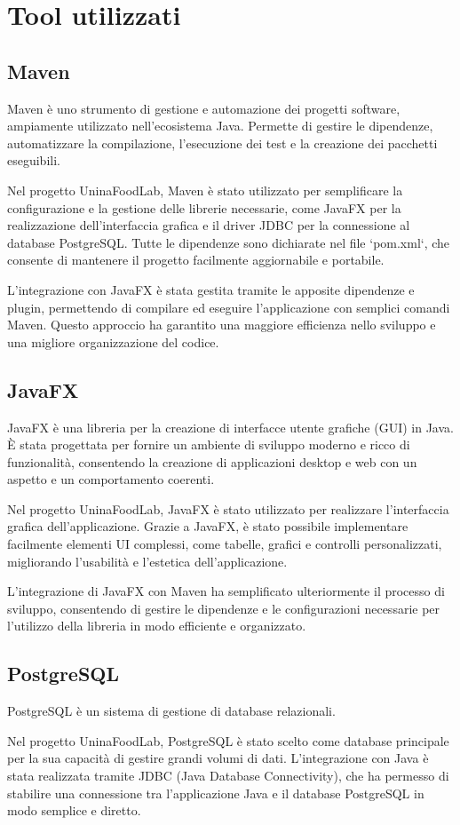 \section{Tool utilizzati}

\subsection{Maven}

Maven è uno strumento di gestione e automazione dei progetti software, ampiamente utilizzato nell’ecosistema Java. Permette di gestire le dipendenze, automatizzare la compilazione, l’esecuzione dei test e la creazione dei pacchetti eseguibili.

Nel progetto UninaFoodLab, Maven è stato utilizzato per semplificare la configurazione e la gestione delle librerie necessarie, come JavaFX per la realizzazione dell’interfaccia grafica e il driver JDBC per la connessione al database PostgreSQL. Tutte le dipendenze sono dichiarate nel file `pom.xml`, che consente di mantenere il progetto facilmente aggiornabile e portabile.

L’integrazione con JavaFX è stata gestita tramite le apposite dipendenze e plugin, permettendo di compilare ed eseguire l’applicazione con semplici comandi Maven. Questo approccio ha garantito una maggiore efficienza nello sviluppo e una migliore organizzazione del codice.


\subsection{JavaFX}

JavaFX è una libreria per la creazione di interfacce utente grafiche (GUI) in Java. È stata progettata per fornire un ambiente di sviluppo moderno e ricco di funzionalità, consentendo la creazione di applicazioni desktop e web con un aspetto e un comportamento coerenti.

Nel progetto UninaFoodLab, JavaFX è stato utilizzato per realizzare l'interfaccia grafica dell'applicazione. Grazie a JavaFX, è stato possibile implementare facilmente elementi UI complessi, come tabelle, grafici e controlli personalizzati, migliorando l'usabilità e l'estetica dell'applicazione.

L'integrazione di JavaFX con Maven ha semplificato ulteriormente il processo di sviluppo, consentendo di gestire le dipendenze e le configurazioni necessarie per l'utilizzo della libreria in modo efficiente e organizzato.

\subsection{PostgreSQL}

PostgreSQL è un sistema di gestione di database relazionali.

Nel progetto UninaFoodLab, PostgreSQL è stato scelto come database principale per la sua capacità di gestire grandi volumi di dati. L'integrazione con Java è stata realizzata tramite JDBC (Java Database Connectivity), che ha permesso di stabilire una connessione tra l'applicazione Java e il database PostgreSQL in modo semplice e diretto.

